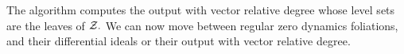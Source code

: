 \documentclass[a4paper]{ifacconf}
\begin{document}
%
The algorithm computes the output with vector relative degree whose level sets are the leaves of \(\mathcal{Z}.\)
We can now move between regular zero dynamics foliations, and their differential ideals or their output with vector relative degree.

\end{document}
